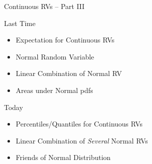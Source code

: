 \documentclass[handout]{beamer}
\date{Lecture \# 12}
\begin{document}
 


\begin{frame}[plain]
	\titlepage 
	

\end{frame} 

\begin{frame}
\Huge \begin{center}
Continuous RVs -- Part III
\end{center}
\end{frame}
\begin{frame}

\begin{block}{Last Time}
\begin{itemize}
	\item Expectation for Continuous RVs
	\item Normal Random Variable
	\item Linear Combination of Normal RV
	\item Areas under Normal pdfs
\end{itemize}
\end{block}

\begin{block}{Today}
	\begin{itemize}
		\item Percentiles/Quantiles for Continuous RVs
		\item Linear Combination of \emph{\alert{Several}} Normal RVs
		\item Friends of Normal Distribution
	\end{itemize}
\end{block}


\end{frame}

\end{document}
